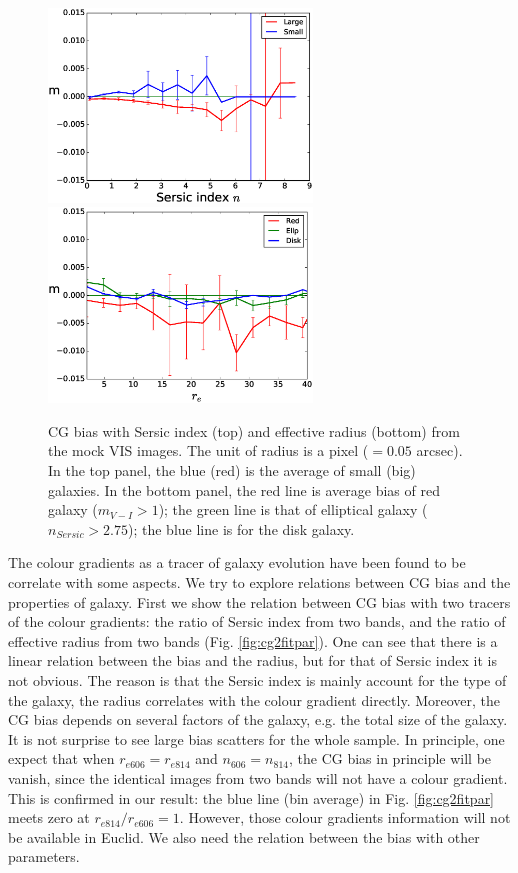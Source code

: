 \documentclass[useAMS,usenatbib]{mnras}
\begin{document}
\begin{figure}
\includegraphics[width=7.0cm]{z2s-ne17.eps}
\includegraphics[width=7.0cm]{z2nscl-re17.eps}
\caption{CG bias with Sersic index (top) and effective radius (bottom)
  from the mock VIS images. The unit of radius is a pixel ($=0.05$
  arcsec). In the top panel, the blue (red) is the average of small
  (big) galaxies. In the bottom panel, the red line is average bias of
  red galaxy ($m_{V-I}>1$); the green line is that of elliptical
  galaxy ($n_{Sersic}>2.75$); the blue line is for the disk galaxy.}
\label{fig:cg2re}
\end{figure}
%
The colour gradients as a tracer of galaxy evolution have been found
to be correlate with some aspects. We try to explore relations between
CG bias and the properties of galaxy. First we show the relation
between CG bias with two tracers of the colour gradients: the ratio of
Sersic index from two bands, and the ratio of effective radius from
two bands (Fig. \ref{fig:cg2fitpar}). One can see that there is a
linear relation between the bias and the radius, but for that of
Sersic index it is not obvious. The reason is that the Sersic index is
mainly account for the type of the galaxy, the radius correlates with
the colour gradient directly. Moreover, the CG bias depends on several
factors of the galaxy, e.g. the total size of the galaxy. It is not
surprise to see large bias scatters for the whole sample. In
principle, one expect that when $r_{e606}=r_{e814}$ and
$n_{606}=n_{814}$, the CG bias in principle will be vanish, since the
identical images from two bands will not have a colour gradient. This
is confirmed in our result: the blue line (bin average) in
Fig. \ref{fig:cg2fitpar} meets zero at $r_{e814}/r_{e606}=1$. However,
those colour gradients information will not be available in Euclid. We
also need the relation between the bias with other parameters.
\end{document}
